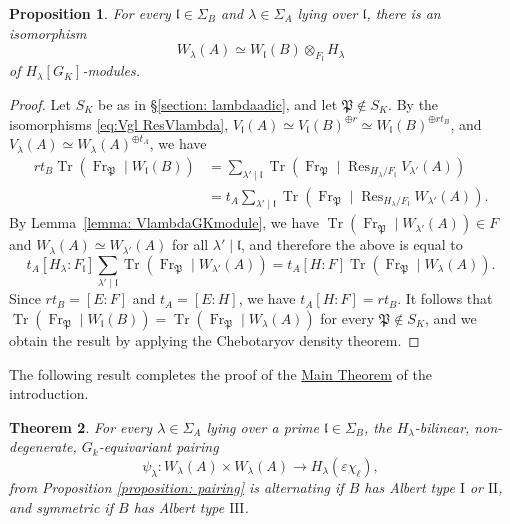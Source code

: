 \documentclass[oneside]{amsart}
\newtheorem{theorem}{Theorem}[section]
\newtheorem{proposition}[theorem]{Proposition}
\theoremstyle{remark}
\newcommand{\Frob}{\operatorname{Fr}}
\newcommand{\Res}{\operatorname{Res}}
\newcommand{\Tr}{\operatorname{Tr}}
\newcommand{\I}{\mathrm{I}}
\newcommand{\II}{\mathrm{II}}
\newcommand{\III}{\mathrm{III}}
\newcommand{\gl}{\mathfrak{l}}
\newcommand{\Pg}{\mathfrak{P}}
\numberwithin{equation}{section}
\begin{document}
\begin{proposition}\label{prop:Wl(B) x H is Wl(A)}
	For every $\gl\in\Sigma_B$ and $\lambda\in \Sigma_A$ lying over $\gl$, there is an isomorphism 
	\[
		W_\lambda(A) \simeq W_\gl(B)\otimes_{F_\gl} H_\lambda
	\]
of $H_\lambda[G_K]$-modules.
\end{proposition}
\begin{proof}
	Let $S_K$ be as in \S\ref{section: lambdaadic}, and let $\Pg\not\in S_K$. By the isomorphisms \eqref{eq:Vgl ResVlambda}, 
	$V_\gl(A)\simeq V_\gl(B)^{\oplus r}\simeq W_\gl(B)^{\oplus rt_B}$,
and $V_\lambda(A)\simeq W_\lambda(A)^{\oplus t_A}$, we have
	\begin{align*}
		rt_B \Tr(\Frob_\Pg\mid W_\gl(B)) 
		&= \sum_{\lambda'\mid\gl}\Tr(\Frob_\Pg\mid \Res_{H_\lambda/F_\gl}V_{\lambda'}(A))\\
		&= t_A \sum_{\lambda'\mid\gl}\Tr(\Frob_\Pg\mid \Res_{H_\lambda/F_\gl}W_{\lambda'}(A)).
	\end{align*}
	By Lemma~\ref{lemma: VlambdaGKmodule}, we have $\Tr(\Frob_\Pg\mid W_{\lambda'}(A))\in F$ and $W_{\lambda}(A)\simeq W_{\lambda'}(A)$ for all $\lambda'\mid\gl$, and therefore the above is equal to
	\[
	t_A[H_\lambda:F_\gl]\sum_{\lambda'\mid\gl}\Tr(\Frob_\Pg\mid W_{\lambda'}(A))
		= t_A[H:F]\Tr(\Frob_\Pg\mid W_{\lambda}(A)).
	\]
	Since $rt_B = [E:F]$ and $t_A=[E:H]$, we have $t_A[H:F]=rt_B$. It follows that $\Tr(\Frob_\Pg\mid W_\gl(B)) = \Tr(\Frob_\Pg\mid W_{\lambda}(A))$ for every $\Pg\not\in S_K$, and we obtain the result by applying the Chebotaryov density theorem.
\end{proof}

The following result completes the proof of the \hyperref[thm:main]{Main Theorem} of the introduction.

\begin{theorem}\label{theorem:equivariant pairing}
For every $\lambda\in \Sigma_A$ lying over a prime $\gl\in \Sigma_B$, the $H_\lambda$-bilinear, non-degenerate, $G_k$-equivariant pairing
	\[
		\psi_\lambda:W_\lambda (A)\times W_\lambda (A) \to H_\lambda(\varepsilon \chi_\ell),
	\]
from Proposition \ref{proposition: pairing} is alternating if $B$ has Albert type $\I$ or $\II$, and symmetric if $B$ has Albert type $\III$. 
\end{theorem}
\end{document}
